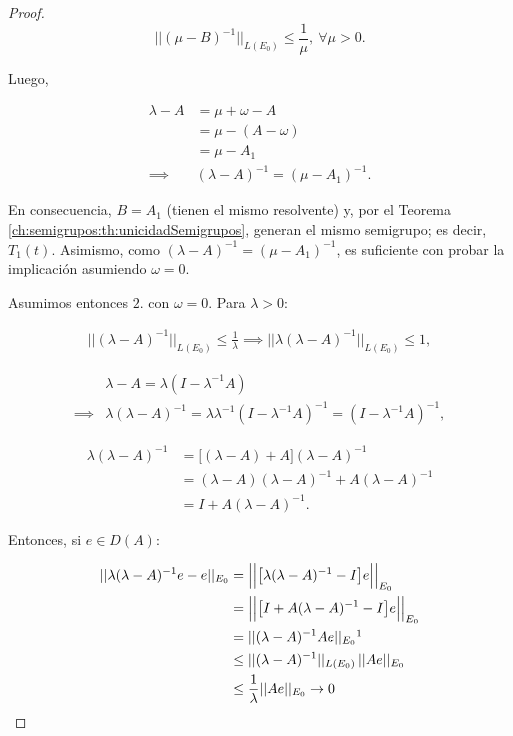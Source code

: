 \begin{proof}
    \[||(\mu - B)^{-1}||_{L(E_0)} \leq \frac{1}{\mu}, \ \forall \mu > 0.\]

    Luego,

    \begin{align*}
        \lambda - A &= \mu + \omega - A\\
        &= \mu - (A - \omega)\\
        &= \mu - A_1\\
        \implies& (\lambda - A)^{-1} = (\mu - A_1)^{-1}.
    \end{align*}

    En consecuencia, $B=A_1$ (tienen el mismo resolvente) y, por el Teorema \ref{ch:semigrupos:th:unicidadSemigrupos}, generan el mismo semigrupo; es decir, $T_1(t)$. Asimismo, como $(\lambda - A)^{-1} = (\mu - A_1)^{-1}$, es suficiente con probar la implicación asumiendo $\omega = 0$.

    Asumimos entonces $2.$ con $\omega = 0$. Para $\lambda > 0$:

    \begin{align*}
        ||(\lambda -A)^{-1}||_{L(E_0)} \leq \frac{1}{\lambda} \implies ||\lambda(\lambda -A)^{-1}||_{L(E_0)} \leq 1,
    \end{align*}

    \begin{align*}
        &\lambda - A = \lambda(I - \lambda^{-1}A)\\
        \implies& \lambda(\lambda - A)^{-1} = \lambda \lambda^{-1}(I - \lambda^{-1}A)^{-1} = (I - \lambda^{-1}A)^{-1}, 
    \end{align*}

    \begin{align*}
        \lambda(\lambda - A)^{-1} &= \big[(\lambda - A) + A \big](\lambda - A)^{-1}\\
        &= (\lambda - A)(\lambda - A)^{-1} + A(\lambda - A)^{-1}\\
        &= I + A(\lambda - A)^{-1}.
    \end{align*}

    Entonces, si $e \in D(A)$:

    \begin{align*}
        ||\lambda(\lambda - A)^{-1}e - e||_{E_0} &= \Big|\Big|\big[\lambda(\lambda - A)^{-1} - I\big]e\Big|\Big|_{E_0}\\
        &= \Big|\Big|\big[I + A(\lambda - A)^{-1} - I\big]e\Big|\Big|_{E_0}\\
        &= ||(\lambda -A)^{-1}Ae||_{E_0}\footnotemark \\
        &\leq ||(\lambda -A)^{-1}||_{L(E_0)} \, ||Ae||_{E_0}\\
        &\leq \frac{1}{\lambda} ||Ae||_{E_0} \rightarrow 0
    \end{align*}


\end{proof}
